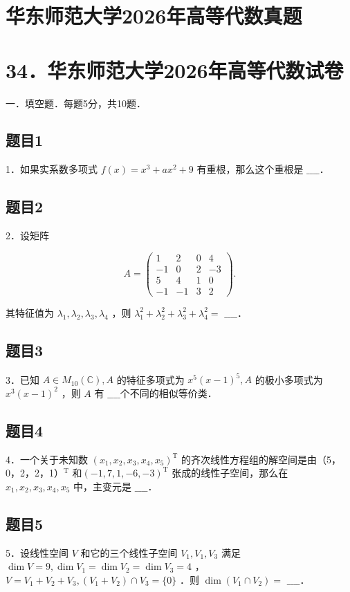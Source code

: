 \documentclass{article}
\begin{document}
\section*{华东师范大学2026年高等代数真题}
\section*{34．华东师范大学2026年高等代数试卷}
一．填空题．每题5分，共10题．\\

\subsection{题目1}
1．如果实系数多项式 \(f(x)=x^{3}+a x^{2}+9\) 有重根，那么这个重根是 \(\_\_\_\_\)．

\subsection{题目2}
2．设矩阵

\[
A=\left(\begin{array}{cccc}
1 & 2 & 0 & 4 \\
-1 & 0 & 2 & -3 \\
5 & 4 & 1 & 0 \\
-1 & -1 & 3 & 2
\end{array}\right) .
\]

其特征值为 \(\lambda_{1}, \lambda_{2}, \lambda_{3}, \lambda_{4}\) ，则 \(\lambda_{1}^{2}+\lambda_{2}^{2}+\lambda_{3}^{2}+\lambda_{4}^{2}=\) \(\_\_\_\_\)．

\subsection{题目3}
3．已知 \(A \in M_{10}(\mathbb{C}), A\) 的特征多项式为 \(x^{5}(x-1)^{5}, A\) 的极小多项式为 \(x^{3}(x-1)^{2}\) ，则 \(A\) 有 \(\_\_\_\_\)个不同的相似等价类．

\subsection{题目4}
4．一个关于未知数 \(\left(x_{1}, x_{2}, x_{3}, x_{4}, x_{5}\right)^{\mathrm{T}}\) 的齐次线性方程组的解空间是由（5，0，2，2，1）\({ }^{\mathrm{T}}\) 和\((-1,7,1,-6,-3)^{\mathrm{T}}\) 张成的线性子空间，那么在 \(x_{1}, x_{2}, x_{3}, x_{4}, x_{5}\) 中，主变元是 \(\_\_\_\_\)．

\subsection{题目5}
5．设线性空间 \(V\) 和它的三个线性子空间 \(V_{1}, V_{1}, V_{3}\) 满足 \(\operatorname{dim} V=9, \operatorname{dim} V_{1}=\operatorname{dim} V_{2}=\operatorname{dim} V_{3}=4\) ， \(V=V_{1}+V_{2}+V_{3},\left(V_{1}+V_{2}\right) \cap V_{3}=\{0\}\) ．则 \(\operatorname{dim}\left(V_{1} \cap V_{2}\right)=\) \(\_\_\_\_\)．
\end{document}
